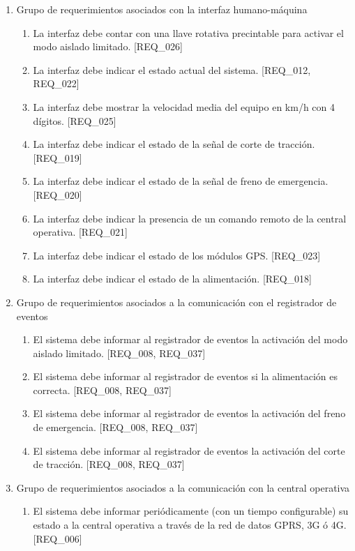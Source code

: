 \documentclass[11pt]{charter}
\begin{document}
\begin{enumerate}
\item Grupo de requerimientos asociados con la interfaz humano-máquina
  \begin{enumerate}
    \item La interfaz debe contar con una llave rotativa precintable para activar el modo aislado limitado. [REQ\_026]
    \item La interfaz debe indicar el estado actual del sistema. [REQ\_012, REQ\_022]
    \item La interfaz debe mostrar la velocidad media del equipo en km/h con 4 dígitos. [REQ\_025]
    \item La interfaz debe indicar el estado de la señal de corte de tracción. [REQ\_019]
    \item La interfaz debe indicar el estado de la señal de freno de emergencia. [REQ\_020]
    \item La interfaz debe indicar la presencia de un comando remoto de la central operativa. [REQ\_021]
    \item La interfaz debe indicar el estado de los módulos GPS. [REQ\_023]
    \item La interfaz debe indicar el estado de la alimentación. [REQ\_018]
  \end{enumerate}
\item Grupo de requerimientos asociados a la comunicación con el registrador de eventos
  \begin{enumerate}
    \item El sistema debe informar al registrador de eventos la activación del modo aislado limitado. [REQ\_008, REQ\_037]
    \item El sistema debe informar al registrador de eventos si la alimentación es correcta. [REQ\_008, REQ\_037]
    \item El sistema debe informar al registrador de eventos la activación del freno de emergencia. [REQ\_008, REQ\_037]
    \item El sistema debe informar al registrador de eventos la activación del corte de tracción. [REQ\_008, REQ\_037]
  \end{enumerate}
\item Grupo de requerimientos asociados a la comunicación con la central operativa
  \begin{enumerate}
    \item El sistema debe informar periódicamente (con un tiempo configurable) su estado a la central operativa a través de la red de datos GPRS, 3G ó 4G. [REQ\_006]

\end{enumerate}
\end{enumerate}
\end{document}
